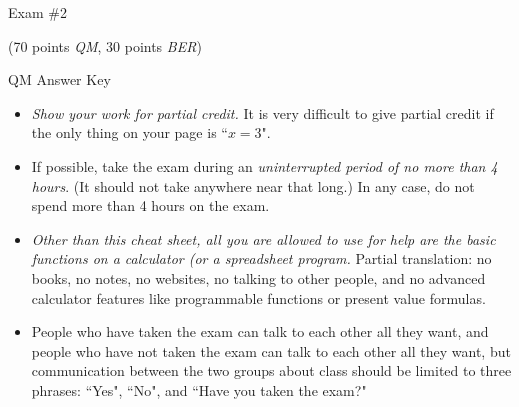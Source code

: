 \documentclass[twoside]{article}
\begin{document}
\begin{EXAM}

\pagestyle{empty}
\thispagestyle{empty}

\vspace*{-3cm}
\enlargethispage{4\baselineskip}

\end{EXAM}

\begin{center}
\Large Exam \#2 \begin{EXAM}(70 points \emph{QM}, 30 points \emph{BER})\end{EXAM} \begin{KEY} QM Answer Key \end{KEY}
\end{center}
\normalsize
\bigskip


\begin{EXAM}
\begin{itemize}
\begin{comment}
\item Other than this cheat sheet (which you should tear off), all you are allowed to use for help are the basic
functions on a calculator.

\item The space provided below each question should be sufficient for your answer, but you can use additional paper if
needed.
\end{comment}

\item \emph{Show your work for partial credit.} It is very difficult to give partial credit if the only thing on your
page is ``$x=3$".


\item If possible, take the exam during an \emph{uninterrupted period of no more than 4 hours}. (It should not take anywhere near that long.) In any case, do not spend more than 4 hours on the exam.

\item \emph{Other than this cheat sheet, all you are allowed to use for help are the basic functions on a calculator (or a spreadsheet program.}
Partial translation: no books, no notes, no websites, no talking to other people, and no advanced calculator features
like programmable functions or present value formulas.

\item People who have taken the exam can talk to each other all they want, and people who have not taken the exam can
talk to each other all they want, but communication between the two groups about class should be limited to three
phrases: ``Yes", ``No", and ``Have you taken the exam?"



\end{itemize}
\end{EXAM}
\end{document}
